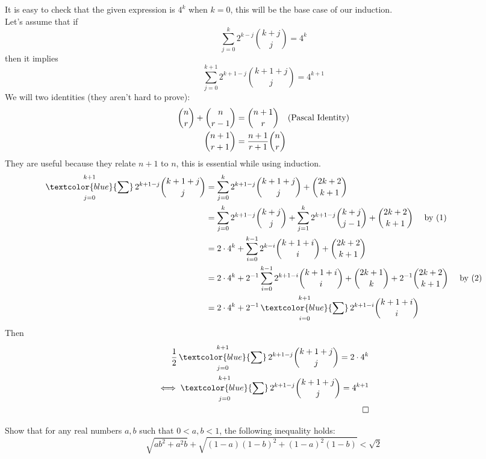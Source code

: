 \begin{solution}
    It is easy to check that the given expression is $4^k$ when $k=0$, this will be the base case of our induction.\\
    Let's assume that if
    $$\sum_{j=0}^k 2^{k-j} \binom{k+j}{j}=4^k$$
    then it implies
    $$\sum_{j=0}^{k+1} 2^{k+1-j} \binom{k+1+j}{j}=4^{k+1}$$
    We will two identities (they aren't hard to prove):
    \begin{align}
        \binom{n}{r}+\binom{n}{r-1}&=\binom{n+1}{r} \text{\hspace{7pt} (Pascal Identity)}\\
        \binom{n+1}{r+1} &= \frac{n+1}{r+1} \binom{n}{r}
    \end{align}
    They are useful because they relate $n+1$ to $n$, this is essential while using induction.
    \begin{align*}
        \mathop{\textcolor{blue}{\sum}}_{j=0}^{k+1} 2^{k+1-j} \binom{k+1+j}{j}
        & =\sum_{j=0}^{k} 2^{k+1-j} \binom{k+1+j}{j} + \binom{2k+2}{k+1}\\
        &= \sum_{j=0}^{k} 2^{k+1-j} \binom{k+j}{j} + \sum_{j=1}^{k} 2^{k+1-j} \binom{k+j}{j-1}+\binom{2k+2}{k+1} \text{\hspace{10pt} by (1)}\\
        &= 2\cdot4^k + \sum_{i=0}^{k-1} 2^{k-i} \binom{k+1+i}{i}+\binom{2k+2}{k+1}\\
        &= 2\cdot4^k + 2^{-1}\sum_{i=0}^{k-1} 2^{k+1-i} \binom{k+1+i}{i}+\binom{2k+1}{k}+2^{-1}\binom{2k+2}{k+1} \text{\hspace{10pt} by (2)}\\
        &= 2\cdot4^k + 2^{-1}\mathop{\textcolor{blue}{\sum}}_{i=0}^{k+1} 2^{k+1-i} \binom{k+1+i}{i}\\
    \end{align*}
    Then
    \begin{align*}
        \frac{1}{2} \mathop{\textcolor{blue}{\sum}}_{j=0}^{k+1} 2^{k+1-j} \binom{k+1+j}{j} = 2 \cdot 4^k \\
        \iff \mathop{\textcolor{blue}{\sum}}_{j=0}^{k+1} 2^{k+1-j} \binom{k+1+j}{j} = 4^{k+1}\\
        \Box
    \end{align*}
\end{solution}

\begin{problem}
    Show that for any real numbers $a,b$ such that $0<a,b<1$, the following inequality holds:
    $$\sqrt{ab^2+a^2b} + \sqrt{(1-a)(1-b)^2+(1-a)^2(1-b)} < \sqrt2$$
\end{problem}

